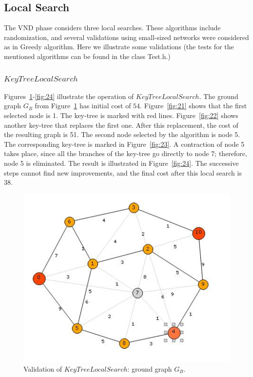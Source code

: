 \subsection{Local Search}
The VND phase considers three local searches. These algorithms include randomization, and several validations 
using small-sized networks were considered as in Greedy algorithm. Here we illustrate some validations 
(the tests for the mentioned algorithms can be found in the class Test.h.)

\subsubsection{$KeyTreeLocalSearch$}
Figures~\ref{fig:20}-\ref{fig:24} illustrate the operation of $KeyTreeLocalSearch$. 
The ground graph $G_B$ from Figure~\ref{fig:20} has initial cost of $54$. Figure~\ref{fig:21} shows that the first selected node is 1. The key-tree is marked with red lines. 
Figure~\ref{fig:22} shows another key-tree that replaces the first one.  
After this replacement, the cost of the resulting graph is 51. The second node selected by the algorithm is node 5. The corresponding key-tree is marked in Figure~\ref{fig:23}. 
A contraction of node 5 takes place, since all the branches of the key-tree go directly to node 7; therefore, node 5 is eliminated. The result is illustrated in Figure~\ref{fig:24}. 
The successive steps cannot find new improvements, and the final cost after this local search is 38.


\begin{figure}[H]
\begin{center}
\includegraphics[scale=0.9]{20.jpg}
\caption{Validation of $KeyTreeLocalSearch$: ground graph $G_B$.}\label{fig:20}
\end{center} 
\end{figure}

